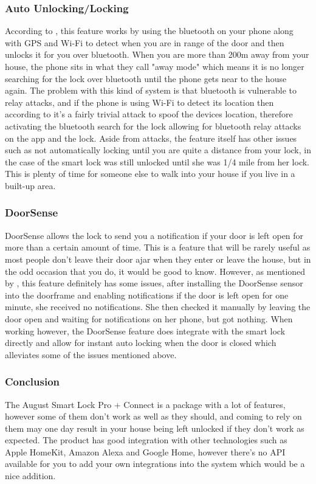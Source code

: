 \subsubsection{Auto Unlocking/Locking}
According to \cite{August2017}, this feature works by using the bluetooth on your phone along with GPS and Wi-Fi to detect when you are in range of the door and then unlocks it for you over bluetooth. When you are more than 200m away from your house, the phone sits in what they call "away mode" which means it is no longer searching for the lock over bluetooth until the phone gets near to the house again. The problem with this kind of system is that bluetooth is vulnerable to relay attacks, and if the phone is using Wi-Fi to detect its location then according to \cite{Feng2014} it's a fairly trivial attack to spoof the devices location, therefore activating the bluetooth search for the lock allowing for bluetooth relay attacks on the app and the lock. Aside from attacks, the feature itself has other issues such as not automatically locking until you are quite a distance from your lock, in the case of \cite{So2017} the smart lock was still unlocked until she was 1/4 mile from her lock. This is plenty of time for someone else to walk into your house if you live in a built-up area.

\subsubsection{DoorSense}
DoorSense allows the lock to send you a notification if your door is left open for more than a certain amount of time. This is a feature that will be rarely useful as most people don't leave their door ajar when they enter or leave the house, but in the odd occasion that you do, it would be good to know. However, as mentioned by \cite{So2017}, this feature definitely has some issues, after installing the DoorSense sensor into the doorframe and enabling notifications if the door is left open for one minute, she received no notifications. She then checked it manually by leaving the door open and waiting for notifications on her phone, but got nothing. When working however, the DoorSense feature does integrate with the smart lock directly and allow for instant auto locking when the door is closed which alleviates some of the issues mentioned above.

\subsubsection{Conclusion}
The August Smart Lock Pro + Connect is a package with a lot of features, however some of them don't work as well as they should, and coming to rely on them may one day result in your house being left unlocked if they don't work as expected. The product has good integration with other technologies such as Apple HomeKit, Amazon Alexa and Google Home, however there's no API available for you to add your own integrations into the system which would be a nice addition.

